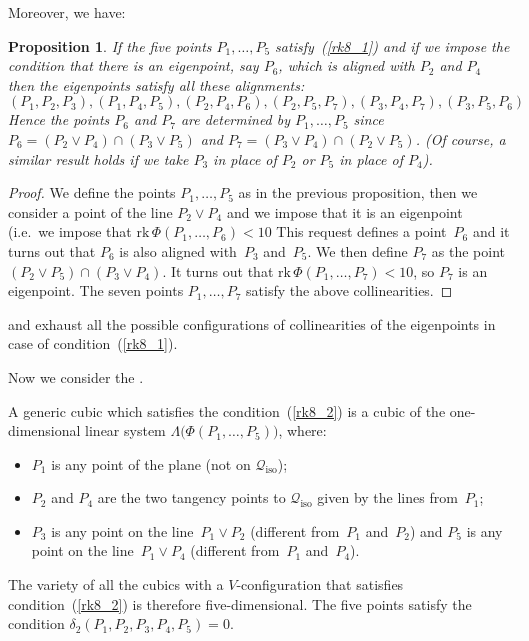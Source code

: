 \documentclass{amsart}
\theoremstyle{plain}
\newtheorem{prop}[lemma]{Proposition}
\theoremstyle{definition}
\newcommand{\iso}{\mathcal{Q}_{\mathrm{iso}}}
\newcommand{\rk}{\ensuremath{\mathrm{rk}}}
\begin{document}
%
Moreover, we have:
%
\begin{prop}
\label{prop:d2_6allin}
If the five points $P_1, \dots, P_5$ satisfy~(\ref{rk8_1})
and if we impose the condition that there is an eigenpoint, say $P_6$,
which is aligned with $P_2$ and $P_4$ then the eigenpoints satisfy all these
alignments:
%
\[
  (P_1, P_2, P_3), (P_1, P_4, P_5),
  (P_2, P_4, P_6), (P_2, P_5, P_7),
  (P_3, P_4, P_7), (P_3, P_5, P_6)
\]
%
Hence the points $P_6$ and $P_7$ are determined by $P_1, \dots, P_5$
since
$P_6 = (P_2 \vee P_4) \cap (P_3 \vee P_5)$
and $P_7 = (P_3 \vee P_4) \cap (P_2 \vee P_5)$.
(Of course, a similar result holds if we take $P_3$ in place of $P_2$ or $P_5$
in place of $P_4$).
\end{prop}
%
\begin{proof}
We define the points $P_1, \dots, P_5$ as in the previous proposition, then 
we consider a point of the line $P_2 \vee P_4$ and we impose that it is 
an eigenpoint (i.e.\ we impose that $\rk \, \Phi(P_1, \dotsc, P_6) < 10$
This request defines a point~$P_6$ and it turns out that $P_6$ is also aligned 
with~$P_3$ and~$P_5$. We then define $P_7$ as the point 
$(P_2 \vee P_5) \cap (P_3 \vee P_4)$. It turns out that 
$\rk \, \Phi(P_1, \dots, P_7) < 10$, so $P_7$ is an eigenpoint. The seven 
points $P_1, \dotsc, P_7$ satisfy the above collinearities.
\end{proof}
 and  exhaust all the possible configurations
of collinearities of the eigenpoints in case of condition~(\ref{rk8_1}).

%

Now we consider the .

%
A generic cubic which satisfies the condition~(\ref{rk8_2}) is
a cubic of the one-dimensional linear system
$\Lambda\bigl(\Phi(P_1, \dotsc, P_5)\bigr)$, where:
%
\begin{itemize}
  \item $P_1$ is any point of the plane (not on $\iso$);
  \item $P_2$ and $P_4$ are the two tangency points to $\iso$ given by the lines from~$P_1$;
  \item $P_3$ is any point on the line~$P_1 \vee P_2$ (different from~$P_1$ and~$P_2$)
  and $P_5$ is any point on the line~$P_1 \vee P_4$ (different from~$P_1$ and~$P_4$).
\end{itemize}
%
The variety of all the cubics with a $V$-configuration
that satisfies condition~(\ref{rk8_2}) is therefore five-dimensional.
The five points satisfy the condition $\delta_2(P_1, P_2, P_3, P_4, P_5) = 0$.
\end{document}
